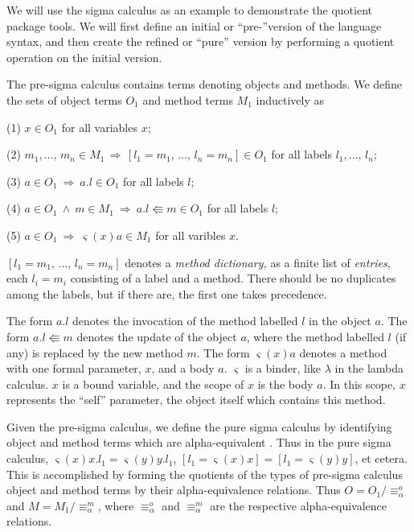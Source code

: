 \documentclass[envcountsame,runningheads]{llncs}
\begin{document}
We will use the sigma calculus as an example to demonstrate the quotient
package tools.
We will first define an initial or ``pre-''version of the
language syntax,
and then create the refined or ``pure'' version
by performing a quotient operation on the initial version.

The pre-sigma calculus contains terms denoting objects and methods.
We define the sets of object terms $O_1$ and method terms $M_1$ inductively as

(1) $x \in O_1$ for all variables $x$;

(2) $m_1, \ldots,\, m_n \in M_1 \,\Rightarrow\,
     [ l_1 \mathbin{=} m_1,\,\ldots,\,l_n \mathbin{=} m_n ] \in O_1$
     for all labels $l_1,\ldots,\,l_n$;

(3) $a \in O_1 \ \Rightarrow \ a.l \in O_1$ for all labels $l$;

(4) $a \in O_1 \ \wedge \ m \in M_1 \ \Rightarrow \ 
     a.l \Lleftarrow m \in O_1$ for all labels $l$;

(5) $a \in O_1 \ \Rightarrow \ \varsigma(x)a \in M_1$ for all varibles $x$.

$[ l_1 \mathbin{=} m_1, \,\ldots,\, l_n \mathbin{=} m_n ]$ denotes a
{\it method dictionary,}
as a finite list of {\it entries}, each $l_i \mathbin{=} m_i$
consisting of a label and a method.
There should be no duplicates among the labels, but if there are, the first
one takes precedence.

The form $a.l$ denotes the invocation of the method labelled $l$ in the
object $a$.  The form $a.l \Lleftarrow m$ denotes the update of the object
$a$, where the method labelled $l$ (if any) is replaced by the new
method $m$.  The form $\varsigma(x)a$ denotes a method with one formal
parameter, $x$, and a body $a$.  $\varsigma$ is a binder, like $\lambda$
in the lambda calculus.  $x$ is a bound variable,
and the scope of $x$ is the body $a$.
In this scope, $x$ represents the ``self'' parameter,
the object itself which contains this method. 

Given the pre-sigma calculus, we define the pure sigma
calculus by identifying object and method terms which are alpha-equivalent
\cite{Bar81}.
Thus in the pure sigma calculus, $\varsigma(x)x.l_1 = \varsigma(y)y.l_1$,
$[l_1 \mathbin{=} \varsigma(x)x] = [l_1 \mathbin{=} \varsigma(y)y]$, et cetera. 
This is accomplished
by forming the quotients of the types of pre-sigma calculus 
object and method terms by their
alpha-equivalence relations.
Thus $O = O_1 / {\equiv}_{\alpha}^o$
and $M = M_1 / {\equiv}_{\alpha}^m$,
where ${\equiv}_{\alpha}^o$ and ${\equiv}_{\alpha}^m$ are the
respective alpha-equivalence relations.
\end{document}
